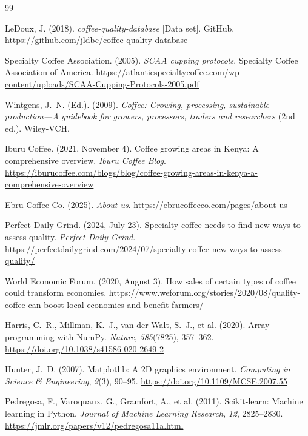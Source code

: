 \documentclass[12pt, a4paper]{article}
\begin{document}

\begin{thebibliography}{99}

LeDoux, J. (2018). \textit{coffee-quality-database} [Data set]. GitHub.
\url{https://github.com/jldbc/coffee-quality-database}

Specialty Coffee Association. (2005). \textit{SCAA cupping protocols}. Specialty Coffee
Association of America.
\url{https://atlanticspecialtycoffee.com/wp-content/uploads/SCAA-Cupping-Protocols-2005.pdf}

Wintgens, J.~N. (Ed.). (2009). \textit{Coffee: Growing, processing, sustainable production---A
guidebook for growers, processors, traders and researchers} (2nd ed.). Wiley-VCH.

Iburu Coffee. (2021, November 4). Coffee growing areas in Kenya: A comprehensive overview.
\textit{Iburu Coffee Blog}.
\url{https://iburucoffee.com/blogs/blog/coffee-growing-areas-in-kenya-a-comprehensive-overview}

Ebru Coffee Co. (2025). \textit{About us}. \url{https://ebrucoffeeco.com/pages/about-us}

Perfect Daily Grind. (2024, July 23). Specialty coffee needs to find new ways to assess quality.
\textit{Perfect Daily Grind}.
\url{https://perfectdailygrind.com/2024/07/specialty-coffee-new-ways-to-assess-quality/}

World Economic Forum. (2020, August 3). How sales of certain types of coffee could transform
economies.
\url{https://www.weforum.org/stories/2020/08/quality-coffee-can-boost-local-economies-and-benefit-farmers/}

Harris, C.~R., Millman, K.~J., van der Walt, S.~J., et al. (2020). Array programming with
NumPy. \textit{Nature}, \textit{585}(7825), 357--362.
\url{https://doi.org/10.1038/s41586-020-2649-2}

Hunter, J.~D. (2007). Matplotlib: A 2D graphics environment. \textit{Computing in Science \&
Engineering}, \textit{9}(3), 90--95. \url{https://doi.org/10.1109/MCSE.2007.55}

Pedregosa, F., Varoquaux, G., Gramfort, A., et al. (2011). Scikit-learn: Machine learning in
Python. \textit{Journal of Machine Learning Research}, \textit{12}, 2825--2830.
\url{https://jmlr.org/papers/v12/pedregosa11a.html}


\end{thebibliography}
\end{document}

